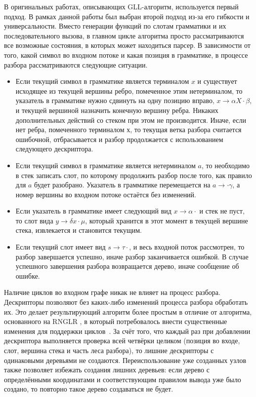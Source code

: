 В оригинальных работах, описывающих GLL-алгоритм, используется первый подход. В рамках данной работы был выбран второй подход из-за его гибкости и универсальности. Вместо генерации функций по слотам грамматики и их последовательного вызова, в главном цикле алгоритма просто рассматриваются все возможные состояния, в которых может находиться парсер. В зависимости от того, какой символ во входном потоке и какая позиция в грамматике, в процессе разбора рассматриваются следующие ситуации.

\begin{itemize}
\item Если текущий символ в грамматике является терминалом $x$ и существует исходящее из текущей вершины ребро, помеченное этим нетерминалом, то указатель в грамматике нужно сдвинуть на одну позицию вправо, $x \rightarrow \alpha X \cdot \beta$, и текущей вершиной назначить конечную вершину ребра. Никаких дополнительных действий со стеком при этом не производится. Иначе, если нет ребра, помеченного терминалом $х$, то текущая ветка разбора считается ошибочной, отбрасывается и  разбор продолжается с использованием следующего дескриптора.
\item Если текущий символ в грамматике является нетерминалом $a$, то необходимо в стек записать слот, по которому продолжить разбор после того, как правило для $a$ будет разобрано. Указатель в грамматике перемещается на $a \rightarrow \cdot \gamma $, а номер вершины во входном потоке остаётся без изменений.
\item Если указатель в грамматике имеет следующий вид $x \rightarrow \alpha\cdot$ и стек не пуст, то слот вида $y \rightarrow \delta x \cdot \mu$, который хранится в этот момент в текущей вершине стека, извлекается и становится текущим.
\item Если текущий слот имеет вид $s \rightarrow \tau\cdot$, и весь входной поток рассмотрен, то разбор завершается успешно, иначе разбор заканчивается ошибкой. В случае успешного завершения разбора возвращается дерево, иначе сообщение об ошибке.
\end{itemize}

Наличие циклов во входном графе никак не влияет на процесс разбора. Дескрипторы позволяют без каких-либо изменений процесса разбора обработать их. Это делает результирующий алгоритм более простым в отличие от алгоритма, основанного на RNGLR , в который потребовалось внести существенные изменения для поддержки циклов~\cite{RelaxedARNGLR}. За счёт того, что каждый раз при добавлении дескриптора выполняется проверка всей четвёрки целиком (позиция во входе, слот, вершина стека и часть леса разбора), то лишние дескрипторы с одинаковыми деревьями не создаются. Переиспользование уже созданных узлов также позволяет избежать создания лишних деревьев: если дерево с определёнными координатами и соответствующим правилом вывода уже было создано, то повторно такое дерево создаваться не будет.

